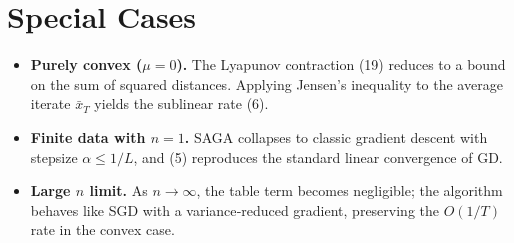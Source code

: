 \documentclass{article}
\begin{document}
\section*{Special Cases}
\begin{itemize}
\item \textbf{Purely convex ($\mu=0$).} The Lyapunov contraction (19) reduces to a bound on the sum of squared distances. Applying Jensen’s inequality to the average iterate $\bar x_T$ yields the sublinear rate (6).
\item \textbf{Finite data with $n=1$.} SAGA collapses to classic gradient descent with stepsize $\alpha\le 1/L$, and (5) reproduces the standard linear convergence of GD.
\item \textbf{Large $n$ limit.} As $n\to\infty$, the table term becomes negligible; the algorithm behaves like SGD with a variance‑reduced gradient, preserving the $O(1/T)$ rate in the convex case.
\end{itemize}
\end{document}

